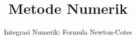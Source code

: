 



\title{Metode Numerik}
\subtitle{Integrasi Numerik: Formula Newton-Cotes}
\date{}


\frame{\titlepage}








